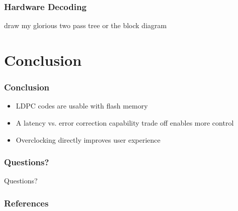\documentclass[	%
				]{beamer}
\begin{document}
\begin{frame}
	\frametitle{Hardware Decoding}
	draw my glorious two pass tree or the block diagram
\end{frame}

\section{Conclusion}
\begin{frame}
	\frametitle{Conclusion}
	\begin{itemize}
		\item LDPC codes are usable with flash memory
		\item A latency vs. error correction capability trade off enables more control
		\item Overclocking directly improves user experience
	\end{itemize}
\end{frame}

\begin{frame}
	\frametitle{Questions?}
	\centering
	\Huge
	Questions?
\end{frame}

\begin{frame}[allowframebreaks]
	\frametitle{References}
	\linespread{1}
	\printbibliography
\end{frame}
\end{document}
